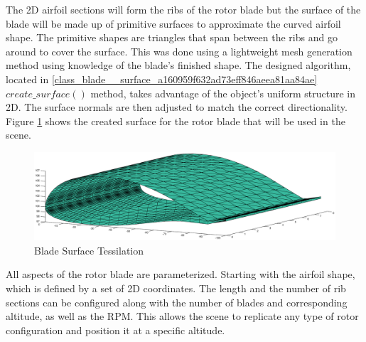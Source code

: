 The 2D airfoil sections will form the ribs of the rotor blade but the surface of the blade will be made up of primitive surfaces to approximate the curved airfoil shape. The primitive shapes are triangles that span between the ribs and go around to cover the surface. This was done using a lightweight mesh generation method using knowledge of the blade's finished shape. The designed algorithm, located in \ref{class_blade__surface_a160959f632ad73eff846aeea81aa84ae} $create\_surface()$ method, takes advantage of the object's uniform structure in 2D. The surface normals are then adjusted to match the correct directionality. Figure \ref{fig:tessilation} shows the created surface for the rotor blade that will be used in the scene.

\begin{figure}
	\begin{center}
		\includegraphics[width=15cm]{images/radio_propagation/blade_surface_tesselation.eps}
		\caption{Blade Surface Tessilation}
		\label{fig:tessilation}
	\end{center}
\end{figure}

All aspects of the rotor blade are parameterized. Starting with the airfoil shape, which is defined by a set of 2D coordinates. The length and the number of rib sections can be configured along with the number of blades and corresponding altitude, as well as the RPM. This allows the scene to replicate any type of rotor configuration and position it at a specific altitude.


